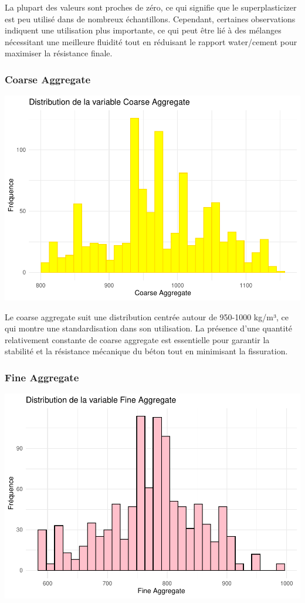 \documentclass[
  12pt,
]{article}
\begin{document}
La plupart des valeurs sont proches de zéro, ce qui signifie que le
superplasticizer est peu utilisé dans de nombreux échantillons.
Cependant, certaines observations indiquent une utilisation plus
importante, ce qui peut être lié à des mélanges nécessitant une
meilleure fluidité tout en réduisant le rapport water/cement pour
maximiser la résistance finale.

\subsubsection{Coarse Aggregate}\label{coarse-aggregate}

\includegraphics{rmd_final_files/figure-latex/unnamed-chunk-6-1.pdf}

Le coarse aggregate suit une distribution centrée autour de 950-1000
kg/m³, ce qui montre une standardisation dans son utilisation. La
présence d'une quantité relativement constante de coarse aggregate est
essentielle pour garantir la stabilité et la résistance mécanique du
béton tout en minimisant la fissuration.

\subsubsection{Fine Aggregate}\label{fine-aggregate}

\includegraphics{rmd_final_files/figure-latex/unnamed-chunk-7-1.pdf}
\end{document}
